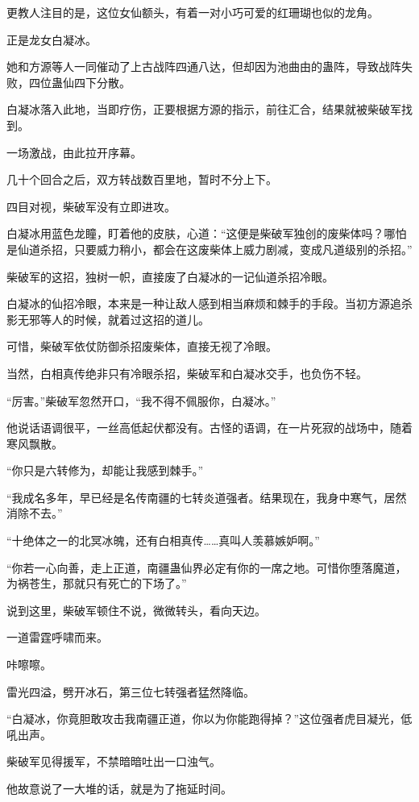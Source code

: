 \begin{this_body}
更教人注目的是，这位女仙额头，有着一对小巧可爱的红珊瑚也似的龙角。

正是龙女白凝冰。

她和方源等人一同催动了上古战阵四通八达，但却因为池曲由的蛊阵，导致战阵失败，四位蛊仙四下分散。

白凝冰落入此地，当即疗伤，正要根据方源的指示，前往汇合，结果就被柴破军找到。

一场激战，由此拉开序幕。

几十个回合之后，双方转战数百里地，暂时不分上下。

四目对视，柴破军没有立即进攻。

白凝冰用蓝色龙瞳，盯着他的皮肤，心道：“这便是柴破军独创的废柴体吗？哪怕是仙道杀招，只要威力稍小，都会在这废柴体上威力剧减，变成凡道级别的杀招。”

柴破军的这招，独树一帜，直接废了白凝冰的一记仙道杀招冷眼。

白凝冰的仙招冷眼，本来是一种让敌人感到相当麻烦和棘手的手段。当初方源追杀影无邪等人的时候，就着过这招的道儿。

可惜，柴破军依仗防御杀招废柴体，直接无视了冷眼。

当然，白相真传绝非只有冷眼杀招，柴破军和白凝冰交手，也负伤不轻。

“厉害。”柴破军忽然开口，“我不得不佩服你，白凝冰。”

他说话语调很平，一丝高低起伏都没有。古怪的语调，在一片死寂的战场中，随着寒风飘散。

“你只是六转修为，却能让我感到棘手。”

“我成名多年，早已经是名传南疆的七转炎道强者。结果现在，我身中寒气，居然消除不去。”

“十绝体之一的北冥冰魄，还有白相真传……真叫人羡慕嫉妒啊。”

“你若一心向善，走上正道，南疆蛊仙界必定有你的一席之地。可惜你堕落魔道，为祸苍生，那就只有死亡的下场了。”

说到这里，柴破军顿住不说，微微转头，看向天边。

一道雷霆呼啸而来。

咔嚓嚓。

雷光四溢，劈开冰石，第三位七转强者猛然降临。

“白凝冰，你竟胆敢攻击我南疆正道，你以为你能跑得掉？”这位强者虎目凝光，低吼出声。

柴破军见得援军，不禁暗暗吐出一口浊气。

他故意说了一大堆的话，就是为了拖延时间。


\end{this_body}
